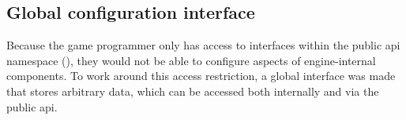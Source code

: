 \documentclass{projdoc}
\begin{document}
%
%
%
%
%
%
%

\subsection{Global configuration interface}

Because the game programmer only has access to interfaces within the public \gls{api}
namespace (), they would not be able to configure aspects of
engine-internal components. To work around this access restriction, a global
interface was made that stores arbitrary data, which can be accessed both internally
and via the public \gls{api}.
\end{document}
